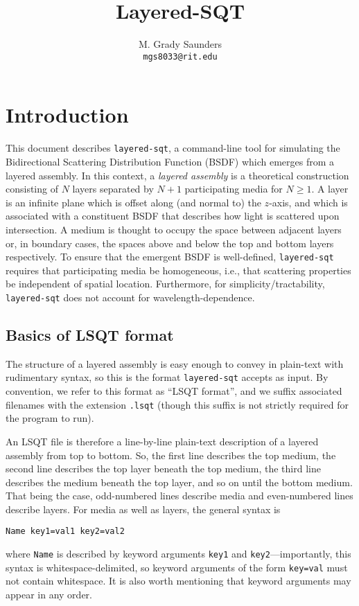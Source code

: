 \documentclass[
    twoside,
    twocolumn,
    letterpaper,
    defaultfont,
    rmheading,
    10pt]{article}
\begin{document}
\title{Layered-SQT}
\author{
M. Grady Saunders\\
\texttt{mgs8033@rit.edu}}
\date{}
\maketitle

\section{Introduction}

This document describes \texttt{layered-sqt}, a command-line 
tool for simulating the Bidirectional Scattering Distribution 
Function (BSDF) which emerges from a layered assembly. In this
context, a \emph{layered assembly} is a theoretical construction
consisting of $N$ layers separated by $N+1$ participating media for
$N \ge 1$. A layer is an infinite plane which is offset along (and 
normal to) the $z$-axis, and which is associated with a constituent 
BSDF that describes how light is scattered upon intersection. 
A medium is thought to occupy the space between adjacent layers or, 
in boundary cases, the spaces above and below the top and bottom 
layers respectively. 
To ensure that the emergent BSDF is well-defined, 
\texttt{layered-sqt} requires that participating media be homogeneous,
i.e., that scattering properties be independent of spatial location. 
Furthermore, for simplicity/tractability, \texttt{layered-sqt} does 
not account for wavelength-dependence.

\subsection{Basics of LSQT format}

The structure of a layered assembly is easy enough to convey 
in plain-text with rudimentary syntax, so this is the format 
\texttt{layered-sqt}
accepts as input. By convention, we refer to this format as
``LSQT format'', and we suffix associated filenames with the extension 
\texttt{.lsqt} (though this suffix is not strictly required for the program
to run). 

An LSQT file is therefore a line-by-line plain-text description of a 
layered assembly from top to bottom. So, the first line describes the 
top medium, the second line describes the top layer beneath the top medium, 
the third line describes the medium beneath the top layer, and so on until 
the bottom medium. That being the case, odd-numbered lines describe media
and even-numbered lines describe layers. For media as well as layers, 
the general syntax is 
\begin{verbatim}
Name key1=val1 key2=val2
\end{verbatim}
where \texttt{Name} is described by keyword arguments 
\texttt{key1} and \texttt{key2}---importantly, this syntax is
whitespace-delimited, so keyword arguments of the form \texttt{key=val} 
must not contain whitespace. It is also worth mentioning that 
keyword arguments may appear in any order.
\end{document}
